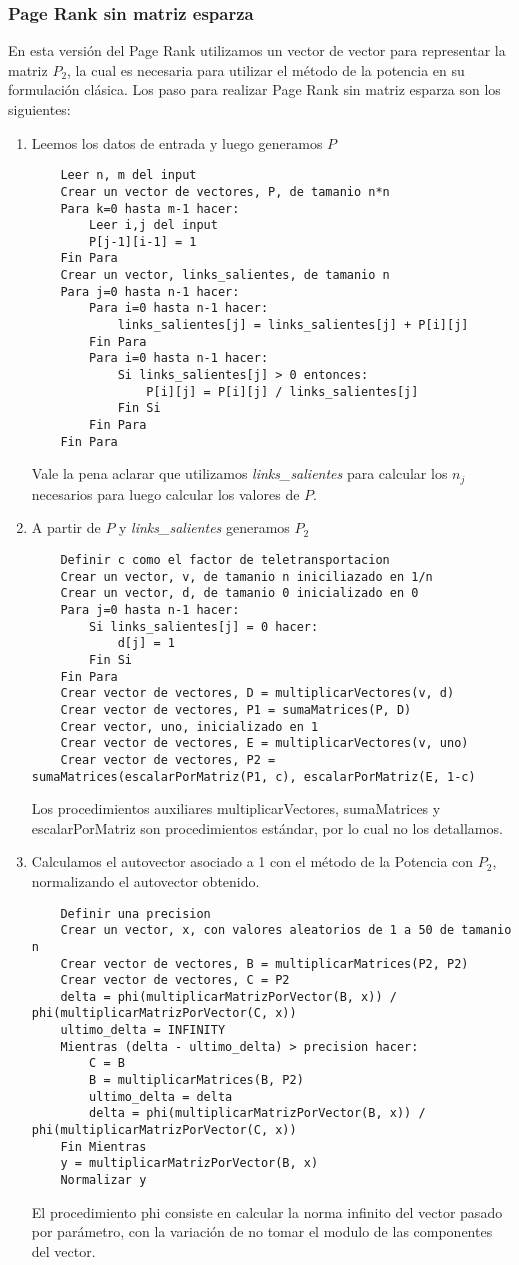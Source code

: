\subsubsection{Page Rank sin matriz esparza}
En esta versión del Page Rank utilizamos un vector de vector para representar la matriz $P_2$, la cual es necesaria para utilizar el método de la potencia en su formulación clásica.
Los paso para realizar Page Rank sin matriz esparza son los siguientes:
\begin{enumerate}
	\item Leemos los datos de entrada y luego generamos $P$
	\begin{lstlisting}
	Leer n, m del input
	Crear un vector de vectores, P, de tamanio n*n
	Para k=0 hasta m-1 hacer:
		Leer i,j del input
		P[j-1][i-1] = 1
	Fin Para
	Crear un vector, links_salientes, de tamanio n
	Para j=0 hasta n-1 hacer:
		Para i=0 hasta n-1 hacer:
			links_salientes[j] = links_salientes[j] + P[i][j]
		Fin Para
		Para i=0 hasta n-1 hacer:
			Si links_salientes[j] > 0 entonces:
				P[i][j] = P[i][j] / links_salientes[j]
			Fin Si
		Fin Para
	Fin Para
	\end{lstlisting}
	Vale la pena aclarar que utilizamos \textit{links_salientes} para calcular los $n_j$ necesarios para luego calcular los valores de $P$.
	\item A partir de $P$ y \textit{links_salientes} generamos $P_2$
	\begin{lstlisting}
	Definir c como el factor de teletransportacion
	Crear un vector, v, de tamanio n iniciliazado en 1/n
	Crear un vector, d, de tamanio 0 inicializado en 0
	Para j=0 hasta n-1 hacer:
		Si links_salientes[j] = 0 hacer:
			d[j] = 1
		Fin Si
	Fin Para
	Crear vector de vectores, D = multiplicarVectores(v, d)
	Crear vector de vectores, P1 = sumaMatrices(P, D)
	Crear vector, uno, inicializado en 1
	Crear vector de vectores, E = multiplicarVectores(v, uno)
	Crear vector de vectores, P2 = sumaMatrices(escalarPorMatriz(P1, c), escalarPorMatriz(E, 1-c)
	\end{lstlisting}
	Los procedimientos auxiliares multiplicarVectores, sumaMatrices y escalarPorMatriz son procedimientos estándar, por lo cual no los detallamos.
	\item Calculamos el autovector asociado a 1 con el método de la Potencia con $P_2$, normalizando el autovector obtenido.
	\begin{lstlisting}
	Definir una precision
	Crear un vector, x, con valores aleatorios de 1 a 50 de tamanio n
	Crear vector de vectores, B = multiplicarMatrices(P2, P2)
	Crear vector de vectores, C = P2
	delta = phi(multiplicarMatrizPorVector(B, x)) / phi(multiplicarMatrizPorVector(C, x))
	ultimo_delta = INFINITY
	Mientras (delta - ultimo_delta) > precision hacer:
		C = B
		B = multiplicarMatrices(B, P2)
		ultimo_delta = delta
		delta = phi(multiplicarMatrizPorVector(B, x)) / phi(multiplicarMatrizPorVector(C, x))
	Fin Mientras
	y = multiplicarMatrizPorVector(B, x)
	Normalizar y
	\end{lstlisting}
	El procedimiento phi consiste en calcular la norma infinito del vector pasado por parámetro, con la variación de no tomar el modulo de las componentes del vector.


\end{enumerate}
